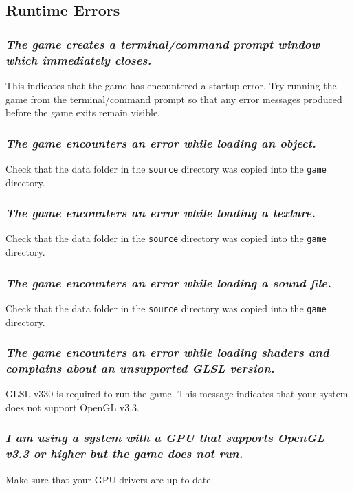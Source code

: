 \documentclass[12pt, titlepage]{article}
\begin{document}
\subsection{Runtime Errors}
\subsubsection{\emph{The game creates a terminal/command prompt window which immediately closes.}}
\noindent This indicates that the game has encountered a startup error.  Try running the game from the terminal/command prompt so that any error messages produced before the game exits remain visible.

\subsubsection{\emph{The game encounters an error while loading an object.}}
\noindent Check that the data folder in the \texttt{source} directory was copied into the \texttt{game} directory.

\subsubsection{\emph{The game encounters an error while loading a texture.}}
\noindent Check that the data folder in the \texttt{source} directory was copied into the \texttt{game} directory.

\subsubsection{\emph{The game encounters an error while loading a sound file.}}
\noindent Check that the data folder in the \texttt{source} directory was copied into the \texttt{game} directory.

\subsubsection{\emph{The game encounters an error while loading shaders and complains about an unsupported GLSL version.}}
\noindent GLSL v330 is required to run the game.  This message indicates that your system does not support OpenGL v3.3.

\subsubsection{\emph{I am using a system with a GPU that supports OpenGL v3.3 or higher but the game does not run.}}
\noindent Make sure that your GPU drivers are up to date.
\end{document}
